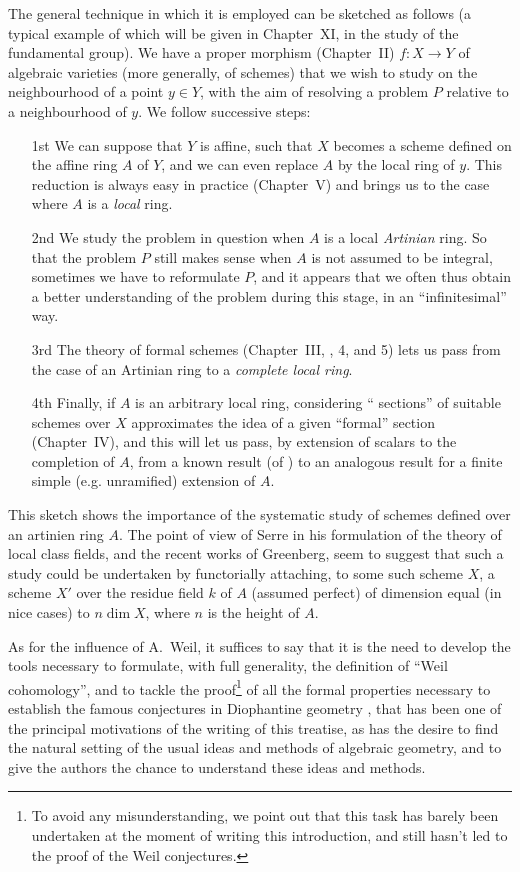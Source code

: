 The general technique in which it is employed can be sketched as follows (a
typical example of which will be given in Chapter~XI, in the study of the
fundamental group). We have a proper morphism (Chapter~II) $f:X\to Y$ of
algebraic varieties (more generally, of schemes) that we wish to study on the
neighbourhood of a point $y\in Y$, with the aim of resolving a problem $P$
relative to a neighbourhood of $y$. We follow successive steps:
\begin{itemize}
  \item[1st]
     We can suppose that $Y$ is affine, such that $X$ becomes a scheme
     defined on the affine ring $A$ of $Y$, and we can even replace $A$
     by the local ring of $y$. This reduction is always easy in practice
     (Chapter~V) and brings us to the case where $A$ is a \emph{local} ring.
  \item[2nd]
     We study the problem in question when $A$ is a local \emph{Artinian}
     ring. So that the problem $P$ still makes sense when $A$ is not
     assumed to be integral, sometimes we have to reformulate $P$, and it
     appears that we often thus obtain a better understanding of the problem
     during this stage, in an ``infinitesimal'' way.
  \item[3rd]
     The theory of formal schemes
     (Chapter~III, \textsection{}, 4, and 5) lets us pass from the
     case of an Artinian ring to a \emph{complete local ring}.
  \item[4th]
     Finally, if $A$ is an arbitrary local ring, considering
     `` sections'' of suitable schemes over $X$
     approximates the idea of a given ``formal'' section (Chapter~IV), and
     this will let us pass,
     by extension of scalars to the completion of $A$, from a known result (of
     \completelyunsure) to an analogous result for a finite simple
     (e.g. unramified) extension of $A$.
\end{itemize}

This sketch shows the importance of the systematic study of schemes defined over
an artinien ring $A$. The point of view of Serre in his formulation of the
theory of local class fields, and the recent works of Greenberg, seem
to suggest that such a study could be undertaken by functorially attaching, to
some such scheme $X$, a scheme $X'$ over the residue field $k$ of $A$ (assumed
perfect) of dimension equal (in nice cases) to $n\dim X$, where $n$ is
the height of $A$.

As for the influence of A.~Weil, it suffices to say that it is the need to
develop the tools necessary to formulate, with full generality, the definition
of ``Weil cohomology'', and to tackle the proof\footnote{To avoid any
misunderstanding, we point out that this task has barely been undertaken at the
moment of writing this introduction, and still hasn't led to the proof of the
Weil conjectures.} of all the formal properties necessary to establish the
famous conjectures in Diophantine geometry \cite{I-19}, that has been one of the
principal motivations of the writing of this treatise, as has the desire to find
the natural setting of the usual ideas and methods of algebraic geometry, and to
give the authors the chance to understand these ideas and methods.

